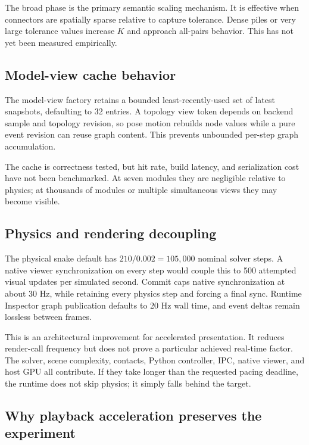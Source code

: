 The broad phase is the primary semantic scaling mechanism. It is effective when
connectors are spatially sparse relative to capture tolerance. Dense piles or very
large tolerance values increase $K$ and approach all-pairs behavior. This has not yet
been measured empirically.

\subsection{Model-view cache behavior}

The model-view factory retains a bounded least-recently-used set of latest snapshots,
defaulting to 32 entries. A topology view token depends on backend sample and topology
revision, so pose motion rebuilds node values while a pure event revision can reuse
graph content. This prevents unbounded per-step graph accumulation.

The cache is correctness tested, but hit rate, build latency, and serialization cost
have not been benchmarked. At seven modules they are negligible relative to physics;
at thousands of modules or multiple simultaneous views they may become visible.

\subsection{Physics and rendering decoupling}

The physical snake default has $210/0.002=105{,}000$ nominal solver steps. A native
viewer synchronization on every step would couple this to 500 attempted visual updates
per simulated second. Commit  caps native synchronization at about 30 Hz,
while retaining every physics step and forcing a final sync. Runtime Inspector graph
publication defaults to 20 Hz wall time, and event deltas remain lossless between
frames.

This is an architectural improvement for accelerated presentation. It reduces
render-call frequency but does not prove a particular achieved real-time factor. The
solver, scene complexity, contacts, Python controller, IPC, native viewer, and host GPU
all contribute. If they take longer than the requested pacing deadline, the runtime
does not skip physics; it simply falls behind the target.

\subsection{Why playback acceleration preserves the experiment}

